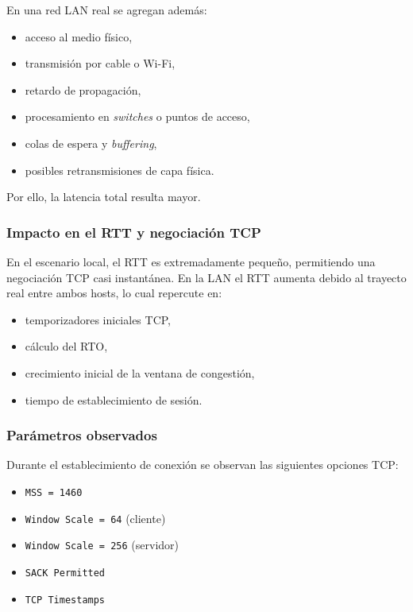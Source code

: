 \documentclass[a4paper,12pt]{article}
\begin{document}
En una red LAN real se agregan además:

\begin{itemize}
    \item acceso al medio físico,
    \item transmisión por cable o Wi-Fi,
    \item retardo de propagación,
    \item procesamiento en \textit{switches} o puntos de acceso,
    \item colas de espera y \textit{buffering},
    \item posibles retransmisiones de capa física.
\end{itemize}

Por ello, la latencia total resulta mayor.

\subsubsection{Impacto en el RTT y negociación TCP}

En el escenario local, el RTT es extremadamente pequeño, permitiendo una negociación TCP casi instantánea. En la LAN el RTT aumenta debido al trayecto real entre ambos hosts, lo cual repercute en:

\begin{itemize}
    \item temporizadores iniciales TCP,
    \item cálculo del RTO,
    \item crecimiento inicial de la ventana de congestión,
    \item tiempo de establecimiento de sesión.
\end{itemize}

\subsubsection{Parámetros observados}

Durante el establecimiento de conexión se observan las siguientes opciones TCP:

\begin{itemize}
    \item \texttt{MSS = 1460}
    \item \texttt{Window Scale = 64} (cliente)
    \item \texttt{Window Scale = 256} (servidor)
    \item \texttt{SACK Permitted}
    \item \texttt{TCP Timestamps}
\end{itemize}
\end{document}

